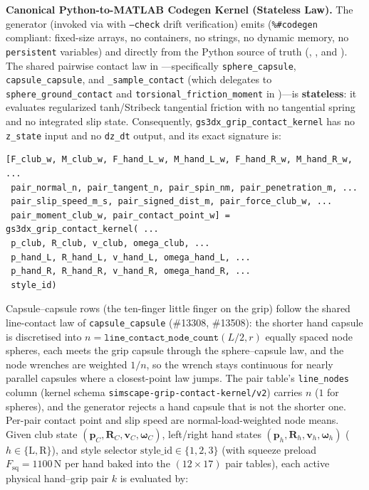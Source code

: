\documentclass[11pt,a4paper]{article}
\begin{document}
\textbf{Canonical Python-to-MATLAB Codegen Kernel (Stateless Law).}
The generator  (invoked via  with \texttt{--check} drift verification) emits  (\texttt{\%\#codegen} compliant: fixed-size arrays, no containers, no strings, no dynamic memory, no \texttt{persistent} variables) and  directly from the Python source of truth (, , and ).
The shared pairwise contact law in ---specifically \texttt{sphere\_capsule}, \texttt{capsule\_capsule}, and \texttt{\_sample\_contact} (which delegates to \texttt{sphere\_ground\_contact} and \texttt{torsional\_friction\_moment} in )---is \textbf{stateless}: it evaluates regularized tanh/Stribeck tangential friction with no tangential spring and no integrated slip state. Consequently, \texttt{gs3dx\_grip\_contact\_kernel} has no \texttt{z\_state} input and no \texttt{dz\_dt} output, and its exact signature is:
\begin{verbatim}
[F_club_w, M_club_w, F_hand_L_w, M_hand_L_w, F_hand_R_w, M_hand_R_w, ...
 pair_normal_n, pair_tangent_n, pair_spin_nm, pair_penetration_m, ...
 pair_slip_speed_m_s, pair_signed_dist_m, pair_force_club_w, ...
 pair_moment_club_w, pair_contact_point_w] = gs3dx_grip_contact_kernel( ...
 p_club, R_club, v_club, omega_club, ...
 p_hand_L, R_hand_L, v_hand_L, omega_hand_L, ...
 p_hand_R, R_hand_R, v_hand_R, omega_hand_R, ...
 style_id)
\end{verbatim}
Capsule--capsule rows (the ten-finger little finger on the grip) follow the shared line-contact law of \texttt{capsule\_capsule} (\#13308, \#13508): the shorter hand capsule is discretised into $n = \texttt{line\_contact\_node\_count}(L/2, r)$ equally spaced node spheres, each meets the grip capsule through the sphere--capsule law, and the node wrenches are weighted $1/n$, so the wrench stays continuous for nearly parallel capsules where a closest-point law jumps. The pair table's \texttt{line\_nodes} column (kernel schema \texttt{simscape-grip-contact-kernel/v2}) carries $n$ ($1$ for spheres), and the generator rejects a hand capsule that is not the shorter one. Per-pair contact point and slip speed are normal-load-weighted node means.
Given club state $(\mathbf{p}_C, \mathbf{R}_C, \mathbf{v}_C, \boldsymbol{\omega}_C)$, left/right hand states $(\mathbf{p}_h, \mathbf{R}_h, \mathbf{v}_h, \boldsymbol{\omega}_h)$ ($h \in \{\mathrm{L}, \mathrm{R}\}$), and style selector $\mathrm{style\_id} \in \{1, 2, 3\}$ (with squeeze preload $F_{\mathrm{sq}} = 1100\,\mathrm{N}$ per hand baked into the $(12 \times 17)$ pair tables), each active physical hand--grip pair $k$ is evaluated by:
\end{document}

